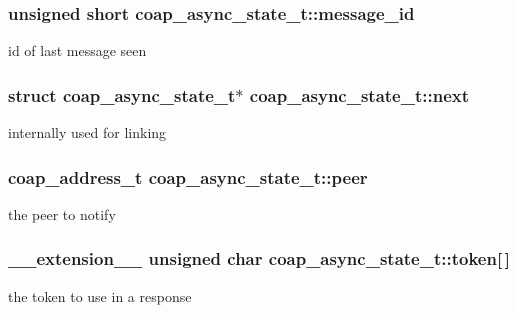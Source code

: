 \subsubsection[{message\+\_\+id}]{\setlength{\rightskip}{0pt plus 5cm}unsigned short coap\+\_\+async\+\_\+state\+\_\+t\+::message\+\_\+id}\label{structcoap__async__state__t_a94feaa6adcb5c4c244dc33608a37ba3f}
id of last message seen \hypertarget{structcoap__async__state__t_ac374efafdd91c332f92c8fc5f33f0a0e}{}
\subsubsection[{next}]{\setlength{\rightskip}{0pt plus 5cm}struct {\bf coap\+\_\+async\+\_\+state\+\_\+t}$\ast$ coap\+\_\+async\+\_\+state\+\_\+t\+::next}\label{structcoap__async__state__t_ac374efafdd91c332f92c8fc5f33f0a0e}
internally used for linking \hypertarget{structcoap__async__state__t_a802335931b57f54c9bb134a46ef2322c}{}
\subsubsection[{peer}]{\setlength{\rightskip}{0pt plus 5cm}coap\+\_\+address\+\_\+t coap\+\_\+async\+\_\+state\+\_\+t\+::peer}\label{structcoap__async__state__t_a802335931b57f54c9bb134a46ef2322c}
the peer to notify \hypertarget{structcoap__async__state__t_a1473f5fc22ca794f1eff2d0c145bdb27}{}
\subsubsection[{token}]{\setlength{\rightskip}{0pt plus 5cm}\+\_\+\+\_\+extension\+\_\+\+\_\+ unsigned char coap\+\_\+async\+\_\+state\+\_\+t\+::token\mbox{[}$\,$\mbox{]}}\label{structcoap__async__state__t_a1473f5fc22ca794f1eff2d0c145bdb27}
the token to use in a response \hypertarget{structcoap__async__state__t_a9ac15543c19c679be1f77442671454fb}{}
